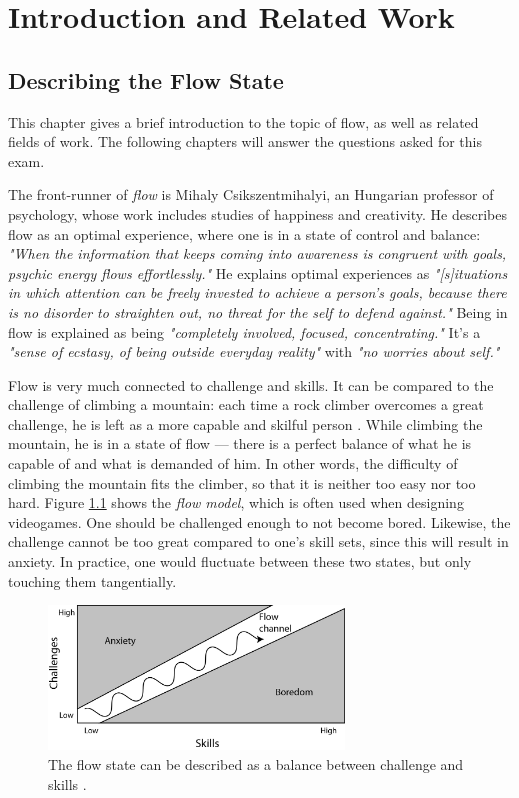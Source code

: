 \chapter{Introduction and Related Work}
\section{Describing the Flow State}
This chapter gives a brief introduction to the topic of flow, as well as related fields of work. The following chapters will answer the questions asked for this exam.

The front-runner of \textit{flow} is Mihaly Csikszentmihalyi, an Hungarian professor of psychology, whose work includes studies of happiness and creativity. He describes flow as an optimal experience, where one is in a state of control and balance: \textit{"When the information that keeps coming into awareness is congruent with goals, psychic energy flows effortlessly."} \citep{flow} He explains optimal experiences as \textit{"[s]ituations in which attention can be freely invested to achieve a person's goals, because there is no disorder to straighten out, no threat for the self to defend against."} \citep{flow} Being in flow is explained as being \textit{"completely  involved, focused, concentrating."} It's a \textit{"sense of ecstasy, of being outside everyday reality"} with \textit{"no worries about self."} \citep{ann_flow}

Flow is very much connected to challenge and skills. It can be compared to the challenge of climbing a mountain: each time a rock climber overcomes a great challenge, he is left as a more capable and skilful person \citep{flow}. While climbing the mountain, he is in a state of flow --- there is a perfect balance of what he is capable of and what is demanded of him. In other words, the difficulty of climbing the mountain fits the climber, so that it is neither too easy nor too hard. Figure \ref{fig:flowModel} shows the \textit{flow model}, which is often used when designing videogames. One should be challenged enough to not become bored. Likewise, the challenge cannot be too great compared to one's skill sets, since this will result in anxiety. In practice, one would fluctuate between these two states, but only touching them tangentially.

\begin{figure}[htbp]
\centering
\includegraphics[width=0.70\textwidth]{Pictures/flow_model}
\caption{The flow state can be described as a balance between challenge and skills \citep{artOfGameDesign}.}
\label{fig:flowModel}
\end{figure}

